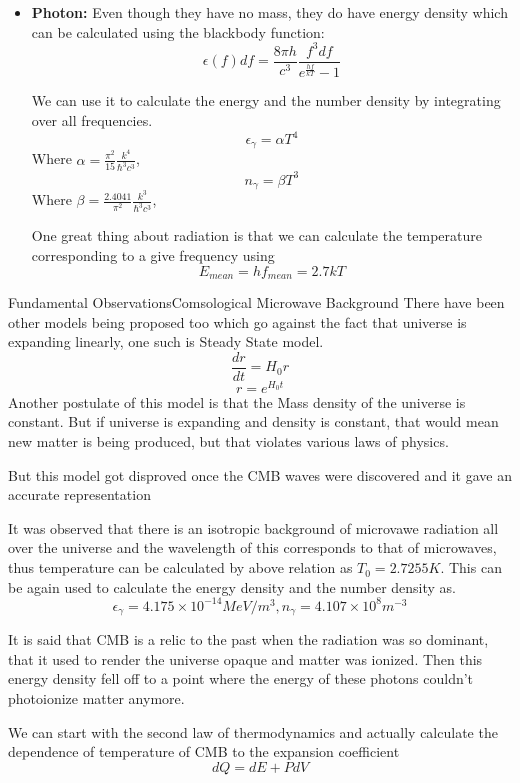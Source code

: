 \begin{frame}
	\begin{itemize}[<+->]
	    \item \textbf{Photon:}
		    Even though they have no mass, they do have energy density
		    which can be calculated using the blackbody function:
		    $$ \epsilon(f)df = \frac{8\pi h}{c^3} \frac{f^3 df}{
		    e^{\frac{hf}{kT}} - 1 } $$

		    We can use it to calculate the energy and the number density
		    by integrating over all frequencies.
		    $$ \epsilon_\gamma = \alpha T^4 $$
		    Where $\alpha = \frac{\pi^2}{15} \frac{k^4}{\hbar^3 c^3}$,
		    $$ n_\gamma = \beta T^3 $$
		    Where $\beta = \frac{2.4041}{\pi^2} \frac{k^3}{\hbar^3 c^3}$,

		    One great thing about radiation is that we can calculate the
		    temperature corresponding to a give frequency using
		    $$ E_{mean} = h f_{mean} = 2.7 k T  $$
		  \end{itemize}
\end{frame}

\begin{frame}{Fundamental Observations}{Comsological Microwave Background}
There have been other models being proposed too which go against the fact that
universe is expanding linearly, one such is Steady State model.
$$ \frac{dr}{dt} = H_0 r $$
$$ r = e^{H_0 t}$$
Another postulate of this model is that the Mass density of the universe is
constant. But if universe is expanding and density is constant, that would mean
new matter is being produced, but that violates various laws of physics.

But this model got disproved once the CMB waves were discovered and it gave an
accurate representation


\end{frame}

\begin{frame}
	It was observed that there is an isotropic background of microvawe
	radiation all over the universe and the wavelength of this corresponds to
	that of microwaves, thus temperature can be calculated by above relation
	as $T_0 = 2.7255 K$. This can be again used to calculate the energy
	density and the number density as.
	$$ \epsilon_\gamma = 4.175 \times 10^{-14} MeV/m^3
	, n_\gamma = 4.107 \times 10^8 m^{-3} $$

	It is said that CMB is a relic to the past when the radiation was so
	dominant, that it used to render the universe opaque and matter was
	ionized. Then this energy density fell off to a point where the energy
	of these photons couldn't photoionize matter anymore.

	We can start with the second law of thermodynamics and actually
	calculate the dependence of temperature of CMB to the expansion
	coefficient
	$$ dQ = dE + PdV $$
\end{frame}
